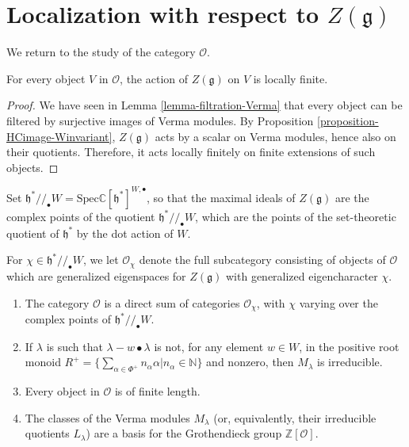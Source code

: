 \section{Localization with respect to $Z(\mathfrak g)$}
\label{section-localization}

We return to the study of the category $\mathcal O$. 

\begin{lemma}
\label{lemma-locally-finite}
For every object $V$ in $\mathcal O$, the action of $Z(\mathfrak g)$ on $V$ is locally finite.
\end{lemma}

\begin{proof}
We have seen in Lemma \ref{lemma-filtration-Verma} that every object can be filtered by surjective images of Verma modules. By Proposition \ref{proposition-HCimage-Winvariant}, $Z(\mathfrak g)$ acts by a scalar on Verma modules, hence also on their quotients. Therefore, it acts locally finitely on finite extensions of such objects.
\end{proof}



Set $\mathfrak h^*//_\bullet W = \text{Spec} \mathbb C[\mathfrak h^*]^{W,\bullet}$, so that the maximal ideals of $Z(\mathfrak g)$ are the complex points of the quotient $\mathfrak h^*//_\bullet W$, which are the points of the set-theoretic quotient of $\mathfrak h^*$ by the dot action of $W$.  

For $\chi\in \mathfrak h^*//_\bullet W$, we let $\mathcal O_\chi$ denote the full subcategory consisting of objects of $\mathcal O$ which are generalized eigenspaces for $Z(\mathfrak g)$ with generalized eigencharacter $\chi$. 

\begin{theorem}
\label{theorem-decomposition-O}
 \begin{enumerate}
  \item The category $\mathcal O$ is a direct sum of categories $\mathcal O_\chi$, with $\chi$ varying over the complex points of $\mathfrak h^*//_\bullet W$.
  \item If $\lambda$ is such that $\lambda-w\bullet \lambda$ is not, for any element $w\in W$, in the positive root monoid $R^+=\{\sum_{\alpha\in\Phi^+} n_\alpha \alpha | n_\alpha\in\mathbb N\}$ and nonzero, then $M_\lambda$ is irreducible.
  \item Every object in $\mathcal O$ is of finite length. 
  \item The classes of the Verma modules $M_\lambda$ (or, equivalently, their irreducible quotients $L_\lambda$) are a basis for the Grothendieck group $\mathbb Z[\mathcal{O}]$.
 \end{enumerate}
\end{theorem}


